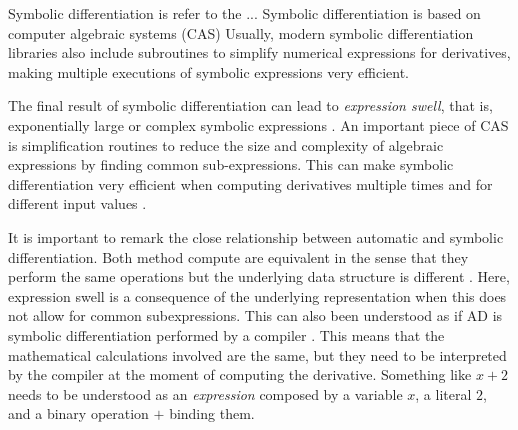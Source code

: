 Symbolic differentiation is refer to the ... 
Symbolic differentiation is based on computer algebraic systems (CAS)
Usually, modern symbolic differentiation libraries also include subroutines to simplify numerical expressions for derivatives, making multiple executions of symbolic expressions very efficient. 

The final result of symbolic differentiation can lead to \textit{expression swell}, that is, exponentially large or complex symbolic expressions \cite{Baydin_Pearlmutter_Radul_Siskind_2015}.
An important piece of CAS is simplification routines to reduce the size and complexity of algebraic expressions by finding common sub-expressions.  
This can make symbolic differentiation very efficient when computing derivatives multiple times and for different input values \cite{Dürrbaum_Klier_Hahn_2002}. 

It is important to remark the close relationship between automatic and symbolic differentiation.
Both method compute are equivalent in the sense that they perform the same operations but the underlying data structure is different \cite{Laue2020}. 
Here, expression swell is a consequence of the underlying representation when this does not allow for common subexpressions. 
This can also been understood as if AD is symbolic differentiation performed by a compiler \cite{Elliott_2018}.
This means that the mathematical calculations involved are the same, but they need to be interpreted by the compiler at the moment of computing the derivative. 
Something like $x + 2$ needs to be understood as an \textit{expression} composed by a variable $x$, a literal $2$, and a binary operation $+$ binding them. 

